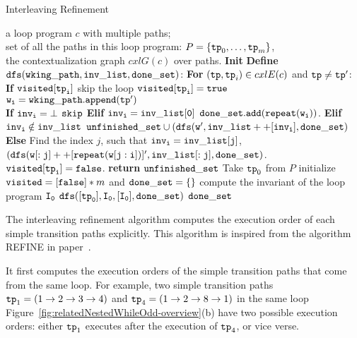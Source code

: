   \begin{algorithm}
    \caption{
    {Interleaving Refinement}
    \label{alg:prog-refine}
    }
    \begin{algorithmic}[1]
    \REQUIRE a loop program $c$ with multiple paths;
    \\
    set of all the paths in this loop program:
    $P = \{\mathtt{tp}_0, \ldots, \mathtt{tp}_m\}$,
    \\
    the contextualization graph $cxlG(c)$ over paths.
    \STATE  \textbf{Init} 
    \STATE \textbf{Define} {$\mathtt{dfs(wking\_path, inv\_list, done\_set)}$:}
    \STATE {}
    \STATE {}
    \STATE \quad \textbf{For} $(\mathtt{tp}, \mathtt{tp}_i) \in cxlE(c)$ and $\mathtt{tp} \neq \mathtt{tp}'$:
    \\
    \STATE \quad \quad \textbf{If} {$\mathtt{visited[\mathtt{tp}_i]}$} skip the loop
    \STATE \quad \quad $\mathtt{visited[\mathtt{tp}_i]} = \mathtt{true}$
    \STATE \quad \quad $\mathtt{w_i = wking\_path.append(\mathtt{tp}')}$
    \\
    \quad {}
    \STATE \quad \quad \textbf{If} {$\mathtt{inv_i = \bot}$} $\mathtt{skip}$
    \STATE \quad \quad \textbf{Elif} {$\mathtt{inv_i = inv\_list[0]}$} $\mathtt{done\_set.add(\mathtt{repeat}(w_i))}$.
    \STATE \quad \quad \textbf{Elif} {$\mathtt{inv_i \notin inv\_list}$} 
    $\mathtt{unfinished\_set \cup (dfs(w', inv\_list++[inv_i], done\_set)}$
    \STATE \quad \quad \textbf{Else} 
    Find the index $j$, such that $\mathtt{inv_i = inv\_list[j] }$,
    \STATE \quad \quad \quad
    $\mathtt{(dfs(w[:j]++[\mathtt{repeat}(w[j:i])]', inv\_list[:j], done\_set)}$.
    \STATE \quad \quad $\mathtt{visited[\mathtt{tp}_i]} = \mathtt{false}$.
    \STATE \quad \textbf{return} $\mathtt{unfinished\_set}$
    \STATE Take $\mathtt{tp}_0$ from $P$ 
    \STATE initialize $\mathtt{visited} = [\mathtt{false}]*m$ and $\mathtt{done\_set = \{\}}$
    \STATE compute the invariant of the loop program $\mathtt{I_0}$
    \STATE $\mathtt{dfs([\mathtt{tp}_0], I_0, [I_0], done\_set )}$
    \RETURN $\mathtt{done\_set}$
    \end{algorithmic}
    \end{algorithm}



The interleaving refinement algorithm computes the execution order of each simple transition paths explicitly.
This algorithm is inspired from the algorithm REFINE in paper~\cite{GulwaniJK09}. 

It first computes the execution orders of
the simple transition paths that come from the same loop.
For example, two simple transition paths $\mathtt{tp}_1 = (1 \to 2 \to 3 \to 4)$ and 
$\mathtt{tp}_4 = (1 \to 2 \to 8 \to 1)$ in the same loop Figure~\ref{fig:relatedNestedWhileOdd-overview}(b) have two possible execution orders:
either $\mathtt{tp}_1$ executes after the execution of $\mathtt{tp}_4$, or vice verse.

